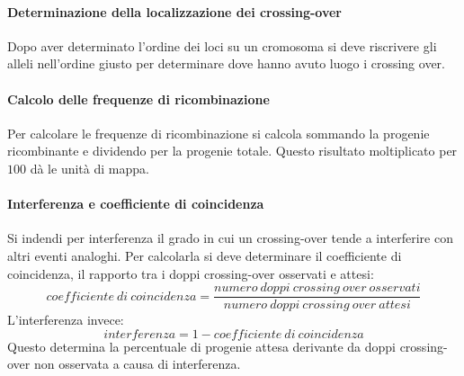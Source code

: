 			\paragraph{Determinazione della localizzazione dei crossing-over}
			Dopo aver determinato l'ordine dei loci su un cromosoma si deve riscrivere gli alleli nell'ordine giusto per determinare dove hanno avuto luogo i crossing over.

			\paragraph{Calcolo delle frequenze di ricombinazione}
			Per calcolare le frequenze di ricombinazione si calcola sommando la progenie ricombinante e dividendo per la progenie totale.
			Questo risultato moltiplicato per $100$ d\`a le unit\`a di mappa.

			\paragraph{Interferenza e coefficiente di coincidenza}
			Si indendi per interferenza il grado in cui un crossing-over tende a interferire con altri eventi analoghi.
			Per calcolarla si deve determinare il coefficiente di coincidenza, il rapporto tra i doppi crossing-over osservati e attesi:
			\[coefficiente\ di\ coincidenza = \dfrac{numero\ doppi\ crossing\ over\ osservati}{numero\ doppi\ crossing\ over\ attesi}\]
			L'interferenza invece:
			\[interferenza = 1 - coefficiente\ di\ coincidenza\]
			Questo determina la percentuale di progenie attesa derivante da doppi crossing-over non osservata a causa di interferenza.
